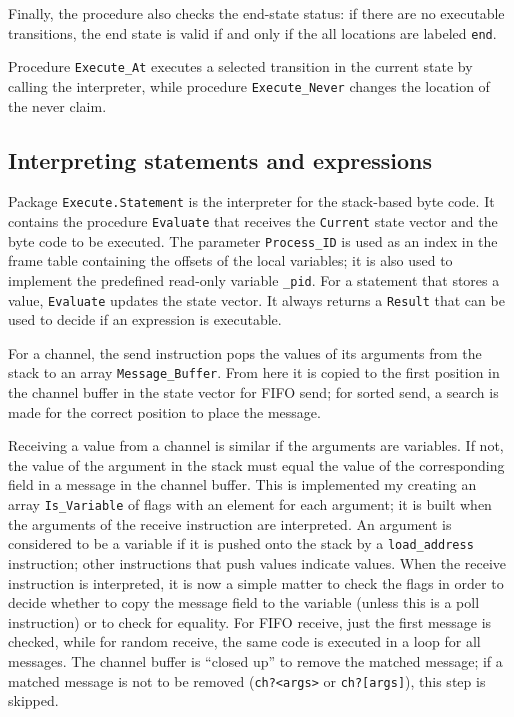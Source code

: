 \documentclass[11pt]{article}
\newcommand*{\p}[1]{\texttt{#1}}
\begin{document}
Finally, the procedure also checks the end-state status: if there are no
executable transitions, the end state is valid if and only if the all
locations are labeled \p{end}.

Procedure \p{Execute\_At} executes a selected transition in the current
state by calling the interpreter, while procedure \p{Execute\_Never}
changes the location of the never claim.

\subsection{Interpreting statements and expressions}

Package \p{Execute.Statement} is the interpreter for the stack-based
byte code. It contains the procedure \p{Evaluate} that receives the
\p{Current} state vector and the byte code to be executed. The parameter
\p{Process\_ID} is used as an index in the frame table containing the
offsets of the local variables; it is also used to implement the
predefined read-only variable \p{\_pid}. For a statement that stores a
value, \p{Evaluate} updates the state vector. It always returns a
\p{Result} that can be used to decide if an expression is executable.

For a channel, the send instruction pops the values of its arguments
from the stack to an array \p{Message\_Buffer}. From here it is copied
to the first position in the channel buffer in the state vector for FIFO
send; for sorted send, a search is made for the correct position to
place the message.

Receiving a value from a channel is similar if the arguments are
variables. If not, the value of the argument in the stack must equal the
value of the corresponding field in a message in the channel buffer.
This is implemented my creating an array \p{Is\_Variable} of flags with
an element for each argument; it is built when the arguments of the
receive instruction are interpreted. An argument is considered to be a
variable if it is pushed onto the stack by a \p{load\_address}
instruction; other instructions that push values indicate values. When
the receive instruction is interpreted, it is now a simple matter to
check the flags in order to decide whether to copy the message field to
the variable (unless this is a poll instruction) or to check for
equality. For FIFO receive, just the first message is checked, while for
random receive, the same code is executed in a loop for all messages.
The channel buffer is ``closed up'' to remove the matched message; if a
matched message is not to be removed (\p{ch?<args>} or \p{ch?[args]}),
this step is skipped.
\end{document}
